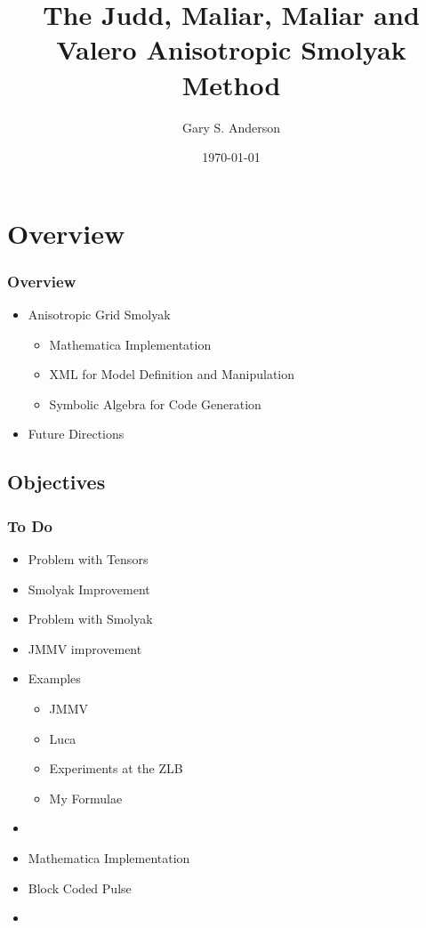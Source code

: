 \documentclass[tikz]{beamer}
\begin{document}
\title[The Anisotropic Smolyak Method]{The Judd, Maliar, Maliar and Valero Anisotropic Smolyak Method}


\author{Gary S. Anderson}
\date{\today} 


\frame{\titlepage}


\section{Overview}



\begin{frame}
  \frametitle{Overview}
  
  \begin{itemize}
    \item Anisotropic Grid Smolyak
    \begin{itemize}
    \item Mathematica Implementation
  \item XML for Model Definition and Manipulation
  \item Symbolic Algebra for Code Generation
    \end{itemize}
  \item Future Directions
  \end{itemize}
\end{frame}


\subsection{Objectives}

\begin{frame}
  \frametitle{To Do}
  \begin{itemize}
  \item Problem with Tensors
  \item Smolyak Improvement
  \item Problem with Smolyak
  \item JMMV improvement
  \item Examples
    \begin{itemize}
    \item JMMV
    \item Luca
    \item Experiments at the ZLB
    \item My Formulae
    \end{itemize}
  \item 
  \item Mathematica Implementation
  \item Block Coded Pulse
  \item 
  \end{itemize}
\end{frame}
\end{document}
